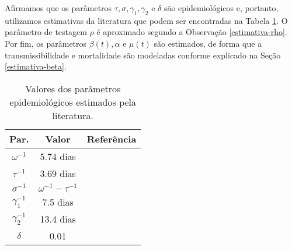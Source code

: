 Afirmamos que os parâmetros $\tau, \sigma, \gamma_1, \gamma_2$ e $\delta$ são epidemiológicos e, portanto, utilizamos estimativas da literatura que podem ser encontradas na Tabela \ref{tab:parameter_values}. 
O parâmetro de testagem $\rho$ é aproximado segundo a Observação \ref{estimativa-rho}. 
Por fim, os parâmetros $\beta(t), \alpha$ e $\mu(t)$ são estimados, de forma que a transmissibilidade e mortalidade são modeladas conforme explicado na Seção \ref{estimativa-beta}. 

\begin{table}[ht]
    \centering
    \begin{tabular}{|c|c|c|}
    \hline
     {\bf Par.} & {\bf Valor} & {\bf Referência} \\[0.5ex]
    \hline 
    $\omega^{-1}$ &  5.74 dias & \cite{incubation2020} \\
    \hline
    $\tau^{-1}$ & 3.69 dias & \cite{latent2020} \\
    \hline
    $\sigma^{-1}$ &  $\omega^{-1} - \tau^{-1}$ & \cite{latent2020} \\
    \hline
    $\gamma_1^{-1}$  & 7.5 dias & \cite{recovery2020} \\
    \hline
    $\gamma_2^{-1}$ & 13.4 dias & \cite{recovery2020} \\
    \hline
    $\delta$ & 0.01 &  \cite{delta2020} \\
    \hline
    \end{tabular}
    \caption{Valores dos parâmetros epidemiológicos estimados pela literatura.}
    \label{tab:parameter_values}
\end{table}

